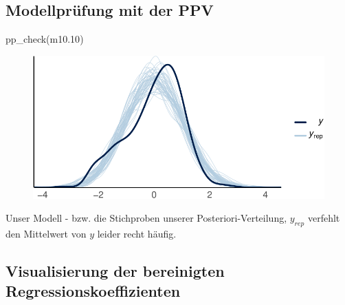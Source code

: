 \documentclass[
  a4paper,
  DIV=11]{scrreprt}
\newenvironment{Shaded}{\begin{snugshade}}{\end{snugshade}}
\newcommand{\FloatTok}[1]{\textcolor[rgb]{0.68,0.00,0.00}{#1}}
\newcommand{\FunctionTok}[1]{\textcolor[rgb]{0.28,0.35,0.67}{#1}}
\newcommand{\NormalTok}[1]{\textcolor[rgb]{0.00,0.23,0.31}{#1}}
\theoremstyle{definition}
\theoremstyle{remark}
\begin{document}
\hypertarget{modellpruxfcfung-mit-der-ppv}{%
\subsection{Modellprüfung mit der
PPV}\label{modellpruxfcfung-mit-der-ppv}}

\begin{Shaded}
\begin{Highlighting}[]
\FunctionTok{pp\_check}\NormalTok{(m10}\FloatTok{.10}\NormalTok{)}
\end{Highlighting}
\end{Shaded}

\begin{figure}[H]

{\centering \includegraphics{./metrische-AV_files/figure-pdf/m10-10-pp-check-1.pdf}

}

\end{figure}

Unser Modell - bzw. die Stichproben unserer Posteriori-Verteilung,
\(y_{rep}\) verfehlt den Mittelwert von \(y\) leider recht häufig.

\hypertarget{visualisierung-der-bereinigten-regressionskoeffizienten}{%
\subsection{Visualisierung der bereinigten
Regressionskoeffizienten}\label{visualisierung-der-bereinigten-regressionskoeffizienten}}
\end{document}
